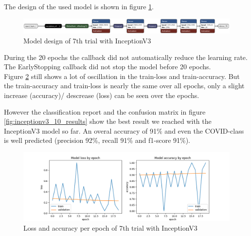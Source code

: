 \documentclass{article}
\begin{document}
The design of the used model is shown in figure \ref{fig:inceptionv3_10.keras_model_design}.
\begin{figure}%
    \centering
    \includegraphics[width=1.0\linewidth]{inceptionv3_10.keras_model_design_nice.png}
    \caption{Model design of 7th trial with InceptionV3}
    \label{fig:inceptionv3_10.keras_model_design}
\end{figure}

During the 20 epochs the callback did not automatically reduce the learning rate. The EarlyStopping callback did not stop the model before 20 epochs.\\

Figure \ref{fig:inceptionv3_10_loss_accuracy} still shows a lot of oscillation in the train-loss and train-accuracy. But the train-accuracy and train-loss is nearly the same over all epochs, only a slight increase (accuracy)/ descrease (loss) can be seen over the epochs. 

However the classification report and the confusion matrix in figure \ref{fig:inceptionv3_10_results} show the best result we reached with the InceptionV3 model so far. An overal accuracy of 91\% and even the COVID-class is well predicted (precision 92\%, recall 91\% and f1-score 91\%).

\begin{figure}%
    \centering
    \includegraphics[width=1.0\linewidth]{inceptionv3_10_loss_accuracy.png}
    \caption{Loss and accuracy per epoch of 7th trial with InceptionV3}
    \label{fig:inceptionv3_10_loss_accuracy}
\end{figure}
\end{document}
